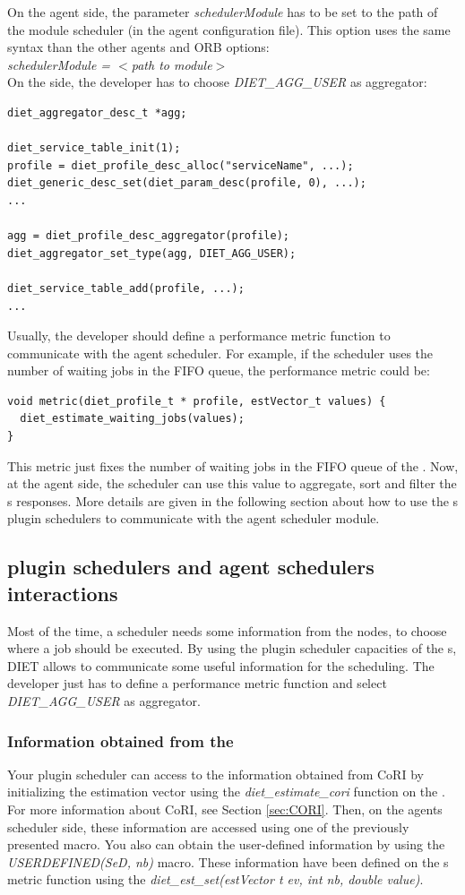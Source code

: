 On the agent side, the parameter \textit{schedulerModule} has to be
set to the path of the module scheduler (in the agent configuration
file). This option uses the same syntax than the other agents and ORB
options:\\
\indent\textit{schedulerModule = $<$path to module$>$}\\
On the {\sed} side, the developer has to choose \textit{DIET\_AGG\_USER} as
aggregator:
\begin{verbatim}
diet_aggregator_desc_t *agg;

diet_service_table_init(1);
profile = diet_profile_desc_alloc("serviceName", ...);
diet_generic_desc_set(diet_param_desc(profile, 0), ...);
...
 
agg = diet_profile_desc_aggregator(profile); 
diet_aggregator_set_type(agg, DIET_AGG_USER);

diet_service_table_add(profile, ...);
...
\end{verbatim}
Usually, the developer should define a performance metric function to
communicate with the agent scheduler. For example, if the scheduler uses
the number of waiting jobs in the FIFO queue, the performance metric
could be:
\begin{verbatim}
void metric(diet_profile_t * profile, estVector_t values) {
  diet_estimate_waiting_jobs(values);
}
\end{verbatim}
This metric just fixes the number of waiting jobs in the FIFO queue of the
{\sed}. Now, at the agent side, the scheduler can use this value to aggregate,
sort and filter the {\sed}s responses. More details are given in the following
section about how to use the {\sed}s plugin schedulers to communicate with the
agent scheduler module.

\subsection{{\sed} plugin schedulers and agent schedulers interactions}
Most of the time, a scheduler needs some information from the nodes, to choose
where a job should be executed. By using the plugin scheduler capacities of
the {\sed}s, DIET allows to communicate some useful information for the 
scheduling. The developer just has to define a performance metric function
and select \textit{DIET\_AGG\_USER} as aggregator.

\subsubsection{Information obtained from the {\sed}}
Your plugin scheduler can access to the information obtained from CoRI
by initializing the estimation vector using the \textit{diet\_estimate\_cori}
function on the {\sed}. For more information about CoRI, see Section
\ref{sec:CORI}. Then, on the agents scheduler side, these information are
accessed using one of the previously presented macro.
You also can obtain the user-defined information by using the
\textit{USERDEFINED(SeD, nb)} macro. These information have been defined
on the {\sed}s metric function using the \textit{diet\_est\_set(estVector t ev,
int nb, double value)}.


